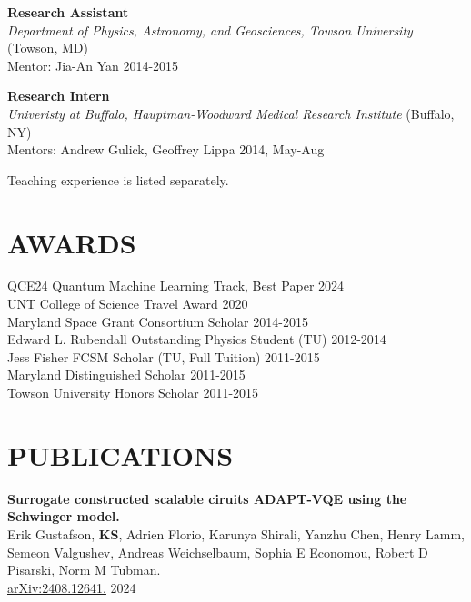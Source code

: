 \documentclass[marginmode, 10pt]{res} %
\newcommand{\me}{\textbf{KS}}       %
\begin{document}
\begin{resume}
\textbf{Research Assistant} \\
\textit{Department of Physics, Astronomy, and Geosciences, Towson University} (Towson, MD) \\
Mentor: Jia-An Yan \hfill 2014-2015

\textbf{Research Intern} \\
\textit{Univeristy at Buffalo, Hauptman-Woodward Medical Research Institute} (Buffalo, NY) \\
Mentors: Andrew Gulick, Geoffrey Lippa \hfill 2014, May-Aug

Teaching experience is listed separately.


\section{\small{AWARDS}}

QCE24 Quantum Machine Learning Track, Best Paper \hfill 2024 \\
UNT College of Science Travel Award \hfill 2020 \\
Maryland Space Grant Consortium Scholar \hfill 2014-2015 \\
Edward L. Rubendall Outstanding Physics Student (TU) \hfill 2012-2014 \\
Jess Fisher FCSM Scholar (TU, Full Tuition) \hfill 2011-2015 \\
Maryland Distinguished Scholar \hfill 2011-2015 \\
Towson University Honors Scholar \hfill 2011-2015


\section{\small{PUBLICATIONS}}

\textbf{Surrogate constructed scalable ciruits ADAPT-VQE using the Schwinger model.} \\
    Erik Gustafson, \me, Adrien Florio, Karunya Shirali, Yanzhu Chen, Henry Lamm, Semeon Valgushev, Andreas Weichselbaum, Sophia E Economou, Robert D Pisarski, Norm M Tubman. \\
    \href{https://arxiv.org/abs/2408.12641}{arXiv:2408.12641.} \hfill 2024


\end{resume}
\end{document}
